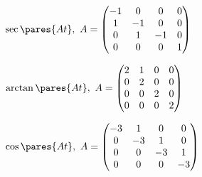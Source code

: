\begin{multicols}{2}
\begin{enumtasks}
			\label{linsys_funcs:matrixAt}
			\item \( \sec \pares{At}, ~ A = \begin{pmatrix} -1 & 0 & 0 & 0 \\ 1 & -1 & 0 & 0 \\ 0 & 1 & -1 & 0 \\ 0 & 0 & 0 & 1 \end{pmatrix} \) %
			\item \( \arctan \pares{At}, ~ A = \begin{pmatrix} 2 & 1 & 0 & 0 \\ 0 & 2 & 0 & 0 \\ 0 & 0 & 2 & 0 \\ 0 & 0 & 0 & 2 \end{pmatrix} \) %
			\item \( \cos \pares{At}, ~ A = \begin{pmatrix} -3 & 1 & 0 & 0 \\ 0 & -3 & 1 & 0 \\ 0 & 0 & -3 & 1 \\ 0 & 0 & 0 & -3 \end{pmatrix} \) %

\end{enumtasks}
\end{multicols}
